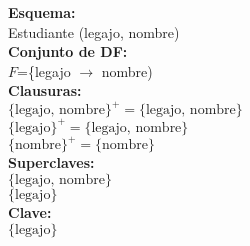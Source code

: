 \documentclass[preview]{standalone}
\begin{document}
\textbf{Esquema:}\\
Estudiante (legajo, nombre)\\

\textbf{Conjunto de DF:}\\
$F$=\{legajo $\rightarrow$ nombre)\\

\textbf{Clausuras:}\\
$\big\{\text{legajo, nombre}\big\}^+ =\big\{\text{legajo, nombre}\big\}$\\
$\big\{\text{legajo}\big\}^+ = \big\{\text{legajo, nombre}\big\}$\\
$\big\{\text{nombre}\big\}^+ = \big\{\text{nombre}\big\}$\\

\textbf{Superclaves: } \\
$\big\{\text{legajo, nombre}\big\}$\\ 
$\big\{\text{legajo}\big\}$\\

\textbf{Clave: }\\ 
$\big\{\text{legajo}\big\}$
\end{document}
